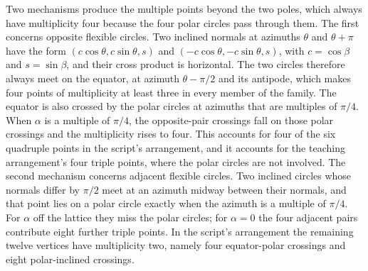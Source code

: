 Two mechanisms produce the multiple points beyond the two poles, which always have multiplicity four because the four polar circles pass through them. The first concerns opposite flexible circles. Two inclined normals at azimuths $\theta$ and $\theta+\pi$ have the form $(c\cos\theta,c\sin\theta,s)$ and $(-c\cos\theta,-c\sin\theta,s)$, with $c=\cos\beta$ and $s=\sin\beta$, and their cross product is horizontal. The two circles therefore always meet on the equator, at azimuth $\theta-\pi/2$ and its antipode, which makes four points of multiplicity at least three in every member of the family. The equator is also crossed by the polar circles at azimuths that are multiples of $\pi/4$. When $\alpha$ is a multiple of $\pi/4$, the opposite-pair crossings fall on those polar crossings and the multiplicity rises to four. This accounts for four of the six quadruple points in the script's arrangement, and it accounts for the teaching arrangement's four triple points, where the polar circles are not involved. The second mechanism concerns adjacent flexible circles. Two inclined circles whose normals differ by $\pi/2$ meet at an azimuth midway between their normals, and that point lies on a polar circle exactly when the azimuth is a multiple of $\pi/4$. For $\alpha$ off the lattice they miss the polar circles; for $\alpha=0$ the four adjacent pairs contribute eight further triple points. In the script's arrangement the remaining twelve vertices have multiplicity two, namely four equator-polar crossings and eight polar-inclined crossings.





